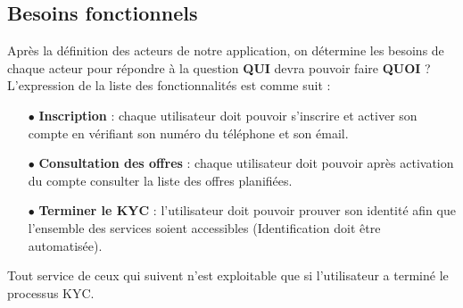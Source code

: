 \subsection{Besoins fonctionnels} %
\label{sub:besoins_fonctionnels}
Après la définition des acteurs de notre application, on détermine les besoins de chaque acteur pour répondre à la question \textbf{QUI} devra pouvoir faire \textbf{QUOI} ?\newline
L'expression de la liste des fonctionnalités est comme suit :
\begin{itemize}
	\item[$\bullet$] \textbf{Inscription} : chaque utilisateur doit pouvoir s'inscrire et activer son compte en vérifiant son numéro du téléphone et son émail.
	\item[$\bullet$] \textbf{Consultation des offres} : chaque utilisateur doit pouvoir après activation du compte consulter la liste des offres planifiées.
	\item[$\bullet$] \textbf{Terminer le KYC} : l'utilisateur doit pouvoir prouver son identité afin que l’ensemble des services soient accessibles (Identification doit être automatisée).
\end{itemize}
Tout service de ceux qui suivent n'est exploitable que si l'utilisateur a terminé le processus KYC.
